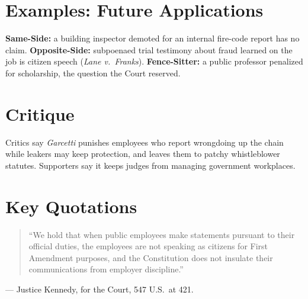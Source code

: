 \documentclass[12pt]{article}
\begin{document}
\section{Examples: Future Applications}
\textbf{Same-Side:} a building inspector demoted for an internal fire-code report has no claim. \textbf{Opposite-Side:} subpoenaed trial testimony about fraud learned on the job is citizen speech (\textit{Lane v.\ Franks}). \textbf{Fence-Sitter:} a public professor penalized for scholarship, the question the Court reserved.

\section{Critique}
Critics say \textit{Garcetti} punishes employees who report wrongdoing up the chain while leakers may keep protection, and leaves them to patchy whistleblower statutes. Supporters say it keeps judges from managing government workplaces.

\section{Key Quotations}
\begin{quote}
``We hold that when public employees make statements pursuant to their official duties, the employees are not speaking as citizens for First Amendment purposes, and the Constitution does not insulate their communications from employer discipline.''
\end{quote}
\noindent --- Justice Kennedy, for the Court, 547 U.S.\ at 421.
\end{document}
